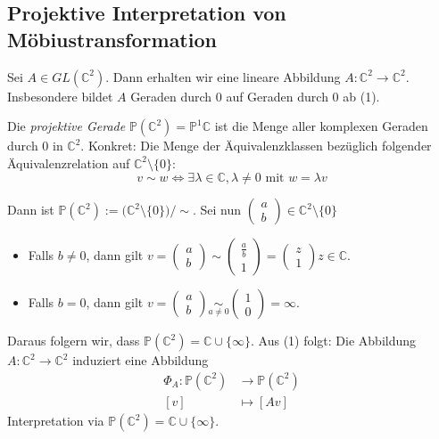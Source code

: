 \documentclass[../main.tex]{subfiles}
\begin{document}
\subsection*{Projektive Interpretation von Möbiustransformation}
Sei $A \in GL(\mathbb{C}^2)$. Dann erhalten wir eine lineare Abbildung
$A : \mathbb{C}^2 \to \mathbb{C}^2$. Insbesondere bildet $A$ Geraden durch 0 auf
Geraden durch 0 ab (1).
\begin{definition}
    Die \emph{projektive Gerade} $\mathbb{P}(\mathbb{C}^2) = \mathbb{P}^1\mathbb{C}$ ist die Menge
    aller komplexen Geraden durch 0 in $\mathbb{C}^2$. Konkret:
    Die Menge der Äquivalenzklassen bezüglich folgender Äquivalenzrelation auf $\mathbb{C}^2 \setminus \{0\}$:
    $$v \sim w \iff \exists \lambda \in \mathbb{C}, \lambda \not = 0 \text{ mit }w = \lambda v$$
\end{definition}

Dann ist 
$\mathbb{P}(\mathbb{C}^2) := \big (\mathbb{C}^2 \setminus \{0\} \big ) / \sim$.
Sei nun $\begin{pmatrix}
    a \\ b
\end{pmatrix} \in \mathbb{C}^2 \setminus \{0\}$
\begin{itemize}
    \item Falls $b \not = 0$, dann gilt 
    $v=\begin{pmatrix}
        a \\b
    \end{pmatrix} \sim \begin{pmatrix}
    \frac{a}{b} \\1
    \end{pmatrix} = \begin{pmatrix}
        z \\1
        \end{pmatrix}
    z \in \mathbb{C}$.

    \item Falls $b=0$, dann gilt
    $v=\begin{pmatrix}
        a \\b
    \end{pmatrix} \underset{a \not = 0}{\sim} \begin{pmatrix}
    1 \\ 0
    \end{pmatrix} = \infty$.

\end{itemize}
Daraus folgern wir, dass $\mathbb{P}(\mathbb{C}^2) = \mathbb{C} \cup \{ \infty \}$.
Aus (1) folgt: Die Abbildung $A : \mathbb{C}^2 \to \mathbb{C}^2$ induziert eine Abbildung
\begin{align*}
    \Phi _A : \mathbb{P}(\mathbb{C}^2) & \to \mathbb{P}(\mathbb{C}^2) \\
    [v] & \mapsto [Av]
\end{align*}
Interpretation via $\mathbb{P}(\mathbb{C}^2) = \mathbb{C} \cup  \{ \infty \}$.
\end{document}
